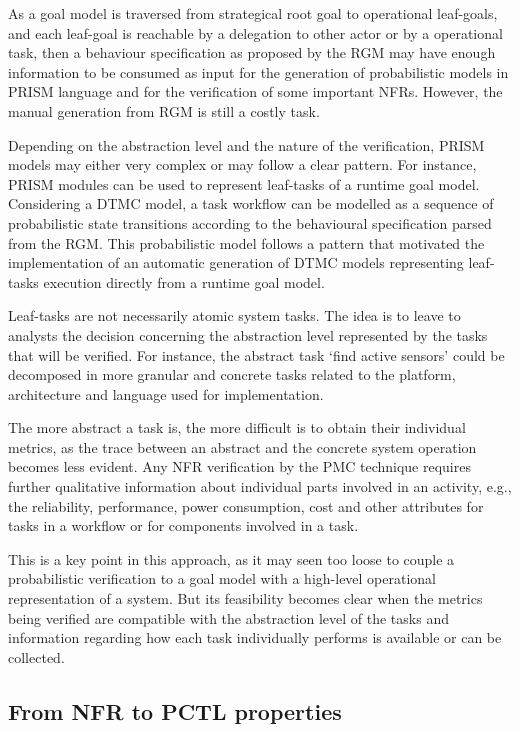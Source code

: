 As a goal model is traversed from strategical root goal to operational leaf-goals, and each leaf-goal is reachable by a delegation to other actor or by a operational task, then a behaviour specification as proposed by the RGM may have enough information to be consumed as input for the generation of probabilistic models in PRISM language and for the verification of some important NFRs. However, the manual generation from RGM is still a costly task.

Depending on the abstraction level and the nature of the verification, PRISM models may either very complex or may follow a clear pattern. For instance, PRISM modules can be used to represent leaf-tasks of a runtime goal model. Considering a DTMC model, a task workflow can be modelled as a sequence of probabilistic state transitions according to the behavioural specification parsed from the RGM. This probabilistic model follows a pattern that motivated the implementation of an automatic generation of DTMC models representing leaf-tasks execution directly from a runtime goal model.

Leaf-tasks are not necessarily atomic system tasks. The idea is to leave to analysts the decision concerning the abstraction level represented by the tasks that will be verified. For instance, the abstract task `find active sensors' could be decomposed in more granular and concrete tasks related to the platform, architecture and language used for implementation. 

The more abstract a task is, the more difficult is to obtain their individual metrics, as the trace between an abstract and the concrete system operation becomes less evident. Any NFR verification by the PMC technique requires further qualitative information about individual parts involved in an activity, e.g., the reliability, performance, power consumption, cost and other attributes for tasks in a workflow or for components involved in a task.

This is a key point in this approach, as it may seen too loose to couple a probabilistic verification to a goal model with a high-level operational representation of a system. But its feasibility becomes clear when the metrics being verified are compatible with the abstraction level of the tasks and information regarding how each task individually performs is available or can be collected.


\subsection{From NFR to PCTL properties}

